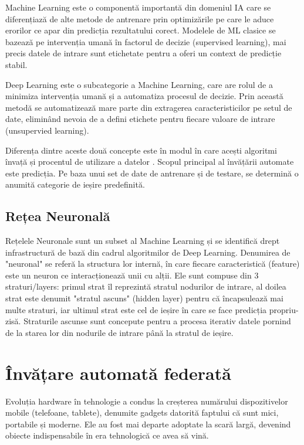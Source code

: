 \documentclass[../../main.tex]{subfiles}
\begin{document}
Machine Learning este o componentă importantă din domeniul IA care se diferențiază de alte metode de antrenare prin optimizările pe care le aduce erorilor ce apar din predicția rezultatului corect.
Modelele de ML clasice se bazează pe intervenția umană în factorul de decizie (supervised learning), mai precis datele de intrare sunt etichetate pentru a oferi un context de predicție stabil.

Deep Learning este o subcategorie a Machine Learning, care are rolul de a minimiza intervenția umană și a automatiza procesul de decizie. Prin această metodă se automatizează mare parte din extragerea caracteristicilor pe setul de date, eliminând nevoia de a defini etichete pentru fiecare valoare de intrare (unsupervied learning).

Diferența dintre aceste două concepte este în modul în care acești algoritmi învață și procentul de utilizare a datelor \cite{ibm_ai_vs_ml_dl}.
Scopul principal al învățării automate este predicția. Pe baza unui set de date de antrenare și de testare, se determină o anumită categorie de ieșire predefinită.

    \subsection{Rețea Neuronală}

    Rețelele Neuronale sunt un subset al Machine Learning și se identifică drept infrastructură de bază din cadrul algoritmilor de Deep Learning. Denumirea de "neuronal" se referă la structura lor internă, în care fiecare caracteristică (feature) este un neuron ce interacționează unii cu alții.
Ele sunt compuse din 3 straturi/layers: primul strat îl reprezintă stratul nodurilor de intrare, al doilea strat este denumit "stratul ascuns" (hidden layer) pentru că încapsulează mai multe straturi, iar ultimul strat este cel de ieșire în care se face predicția propriu-zisă.
Straturile ascunse sunt concepute pentru a procesa iterativ datele pornind de la starea lor din nodurile de intrare până la stratul de ieșire.


    \section{Învățare automată federată}

    Evoluția hardware în tehnologie a condus la creșterea numărului dispozitivelor mobile (telefoane, tablete), denumite gadgets datorită faptului că sunt mici, portabile și moderne.
Ele au fost mai departe adoptate la scară largă, devenind obiecte indispensabile în era tehnologică ce avea să vină.
\end{document}
